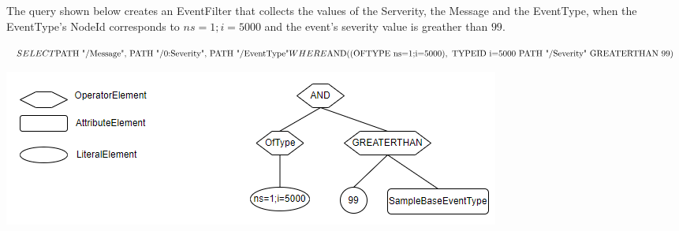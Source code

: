 \documentclass[10pt]{scrreprt}
\begin{document}
The query shown below creates an EventFilter that collects the values of the Serverity, the Message and the EventType, when the EventType's NodeId corresponds to $ns=1;i=5000$ and
the event's severity value is greather than $99$.


\begin{addmargin}[35pt]{0pt}
    $
    SELECT \newline
    \text{PATH "/Message", PATH "/0:Severity", PATH "/EventType"} \newline
    WHERE \newline
    \text{AND}(\text{(OFTYPE ns=1;i=5000)}, \text{ TYPEID i=5000 PATH "/Severity" GREATERTHAN }99)
    $
\end{addmargin}

\includegraphics[width=\textwidth]{case_4.png}
\begin{table}[h]
    \centering
    \caption{\textbf{Case 4}}
    \label{tab:Case_4}
\end{table}
\end{document}
